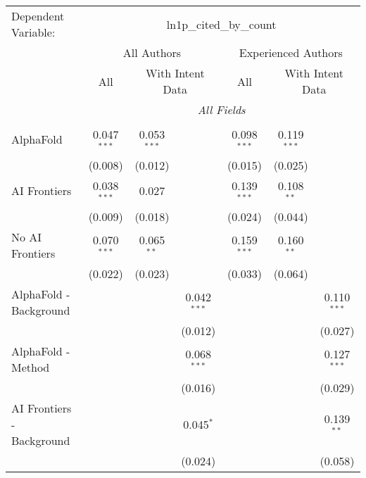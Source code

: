 \begingroup
\centering
\begin{tabular}{lcccccc}
   \tabularnewline \midrule \midrule
   Dependent Variable: & \multicolumn{6}{c}{ln1p\_cited\_by\_count}\\
 & \multicolumn{3}{c}{All Authors} & \multicolumn{3}{c}{Experienced Authors} \\
\cmidrule(lr){2-4} \cmidrule(lr){5-7}
 & \multicolumn{1}{c}{All} & \multicolumn{2}{c}{With Intent Data} & \multicolumn{1}{c}{All} & \multicolumn{2}{c}{With Intent Data} \\
\cmidrule(lr){2-2} \cmidrule(lr){3-4} \cmidrule(lr){5-5} \cmidrule(lr){6-7}
 & \multicolumn{6}{c}{\textit{All Fields}} \\ \\
   AlphaFold                    & 0.047$^{***}$ & 0.053$^{***}$ &               & 0.098$^{***}$ & 0.119$^{***}$ &   \\   
                                & (0.008)       & (0.012)       &               & (0.015)       & (0.025)       &   \\   
   AI Frontiers                 & 0.038$^{***}$ & 0.027         &               & 0.139$^{***}$ & 0.108$^{**}$  &   \\   
                                & (0.009)       & (0.018)       &               & (0.024)       & (0.044)       &   \\   
   No AI Frontiers              & 0.070$^{***}$ & 0.065$^{**}$  &               & 0.159$^{***}$ & 0.160$^{**}$  &   \\   
                                & (0.022)       & (0.023)       &               & (0.033)       & (0.064)       &   \\   
   AlphaFold - Background       &               &               & 0.042$^{***}$ &               &               & 0.110$^{***}$\\   
                                &               &               & (0.012)       &               &               & (0.027)\\   
   AlphaFold - Method           &               &               & 0.068$^{***}$ &               &               & 0.127$^{***}$\\   
                                &               &               & (0.016)       &               &               & (0.029)\\   
   AI Frontiers - Background    &               &               & 0.045$^{*}$   &               &               & 0.139$^{**}$\\   
                                &               &               & (0.024)       &               &               & (0.058)\\   

\end{tabular}
